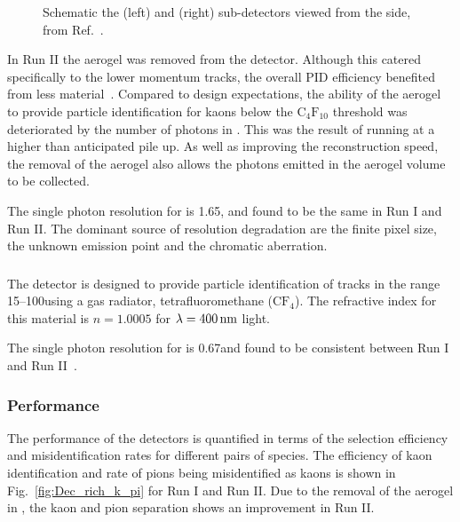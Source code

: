 \begin{figure}[!h]
\begin{subfigure}[t]{0.4\textwidth}
        \caption{\richtwo}
    \end{subfigure}
    \caption{Schematic the \richone (left) and \richtwo (right) sub-detectors viewed from the side, from Ref.~\cite{Alves:2008zz}.}

    \label{fig:Dec_rich_layout}   
\end{figure}
In Run II the aerogel was removed from the \richone detector. Although this catered specifically to the lower momentum tracks, the overall PID efficiency benefited from less material~\cite{PAPANESTIS2017221}. Compared to design expectations, the ability of the aerogel to provide particle identification for kaons below the $\text{C}_{4}\text{F}_{10}$ threshold was deteriorated by the number of photons in \richone. This was the result of \lhcb running at a higher than anticipated pile up. As well as improving the reconstruction speed, the removal of the aerogel also allows the photons emitted in the aerogel volume to be collected. 

The single photon resolution for \richone is 1.65\mrad, and found to be the same in Run I and Run II. The dominant source of resolution degradation are the finite pixel size, the unknown emission point and the chromatic aberration.  


\subsubsection{\richtwo}

The \richtwo detector is designed to provide particle identification of tracks in the range 15--100\gevc using a gas radiator, tetrafluoromethane ($\text{C}\text{F}_{4}$). The refractive index for this material is $n=1.0005$ for $\lambda = 400\mathrm{ \,nm}$ light.

The single photon resolution for \richtwo is 0.67\mrad and found to be consistent between Run I and Run II~\cite{PAPANESTIS2017221}.


\subsubsection{Performance}
The performance of the \rich detectors is quantified in terms of the selection efficiency and misidentification rates for different pairs of species. The efficiency of kaon identification and rate of pions being misidentified as kaons is shown in Fig.~\ref{fig:Dec_rich_k_pi} for Run I and Run II. Due to the removal of the aerogel in \richone, the kaon and pion separation shows an improvement in Run II.

